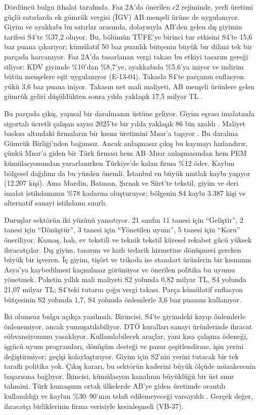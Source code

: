 Dördüncü bulgu ithalat tarafında. Faz 2A'da önerilen c2 rejiminde, yerli üretimi güçlü satırlarda ek gümrük vergisi (İGV) AB menşeli ürüne de uygulanıyor. Giyim ve ayakkabı bu satırlar arasında, dolayısıyla AB'den gelen dış giyimin tarifesi S4'te \%37,2 oluyor. Bu, bölümün TÜFE'ye birinci tur etkisini S4'te 15,6 baz puana çıkarıyor; kümülatif 50 baz puanlık bütçenin büyük bir dilimi tek bir parçada harcanıyor. Faz 2A'da tasarlanan vergi takası bu etkiyi tasarım gereği siliyor: KDV giyimde \%10'dan \%8,7'ye, ayakkabıda \%5,6'ya iniyor ve indirim bütün menşelere eşit uygulanıyor (E-13-04). Takasla S4'te parçanın enflasyon yükü 3,6 baz puana iniyor. Takasın net mali maliyeti, AB menşeli ürünlere gelen gümrük geliri düşüldükten sonra yılda yaklaşık 17,5 milyar TL \etiketT{}.

Bu parçada çıkış, yapısal bir daralmanın üstüne geliyor. Giyim eşyası imalatında sigortalı ücretli çalışan sayısı 2025'te bir yılda yaklaşık 86 bin azaldı \etiketV{}. Maliyet baskısı altındaki firmaların bir kısmı üretimini Mısır'a taşıyor \etiketV{}. Bu daralma Gümrük Birliği'nden bağımsız. Ancak anlaşmasız çıkış bu kaymayı hızlandırır, çünkü Mısır'a giden bir Türk firması hem AB--Mısır anlaşmasından hem PEM kümülasyonundan yararlanırken Türkiye'de kalan firma \%12 öder. Kaybın bölgesel dağılımı da bu yüzden önemli. İstanbul en büyük mutlak kaybı yaşıyor (12.207 kişi). Ama Mardin, Batman, Şırnak ve Siirt'te tekstil, giyim ve deri imalat istihdamının \%78 kadarını oluşturuyor; bölgenin S4 kaybı 3.387 kişi ve alternatif sanayi istihdamı sınırlı.

Duruşlar sektörün iki yüzünü yansıtıyor. 21 sınıfın 11 tanesi için ``Geliştir'', 2 tanesi için ``Dönüştür'', 3 tanesi için ``Yönetilen uyum'', 5 tanesi için ``Koru'' öneriliyor. Kumaş, halı, ev tekstili ve teknik tekstil küresel rekabet gücü yüksek ihracatçılar. Dış giyim, tasarım ve hızlı tedarik hizmetine dönüşmesi gereken büyük bir işveren. İç giyim, tişört ve trikoda ise standart ürünlerin bir kısmının Asya'ya kaybedilmesi kaçınılmaz görünüyor ve önerilen politika bu uyumu yönetmek. Paketin yıllık mali maliyeti S2 yolunda 0,82 milyar TL, S4 yolunda 21,07 milyar TL; S4'teki tutarın çoğu vergi takası. Parça kümülatif enflasyon bütçesinin S2 yolunda 1,7, S4 yolunda önlemlerle 3,6 baz puanını kullanıyor.

İki olumsuz bulgu açıkça yazılmalı. Birincisi, S4'te giyimdeki kayıp önlemlerle önlenemiyor, ancak yumuşatılabiliyor. DTÖ kuralları sanayi ürünlerinde ihracat sübvansiyonunu yasaklıyor. Kullanılabilecek araçlar, yani kısa çalışma ödeneği, işgücü uyum programları, dönüşüm desteği ve pazar çeşitlendirme, işin yerini değiştirmiyor; geçişi kolaylaştırıyor. Giyim için S2'nin yerini tutacak bir tek taraflı politika yok. Çıkış kararı, bu sektörün kaderini büyük ölçüde müzakerenin başarısına bağlıyor. İkincisi, kümülasyon kanalının büyüklüğü bir üst sınır tahmini. Türk kumaşının ortak ülkelerde AB'ye giden üretimde orantılı kullanıldığı ve kaybın \%30--90'ının telafi edilemeyeceği varsayıldı \etiketH{}. Gerçek değer, ihracatçı birliklerinin firma verisiyle kesinleşmeli (VB-37).

